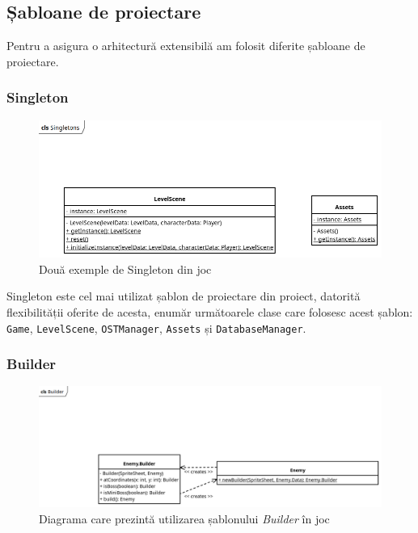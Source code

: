 \documentclass{article}
\begin{document}
    \inputminted[linenos, breaklines]{json}{example-level.json}

    \subsection{Șabloane de proiectare}

    Pentru a asigura o arhitectură extensibilă am folosit diferite șabloane de proiectare.

    \subsubsection{Singleton}
    \begin{figure}[H]
        \includegraphics[width=\textwidth]{singletons-diagram}
        \centering
        \caption{Două exemple de Singleton din joc}
    \end{figure}

    Singleton este cel mai utilizat șablon de proiectare din proiect, datorită flexibilității
    oferite de acesta, enumăr următoarele clase care folosesc acest șablon: \texttt{Game},
    \texttt{LevelScene}, \texttt{OSTManager}, \texttt{Assets} și \texttt{DatabaseManager}.

    \subsubsection{Builder}
    \begin{figure}[H]
        \includegraphics[width=\textwidth]{builder-diagram}
        \centering
        \caption{Diagrama care prezintă utilizarea șablonului \emph{Builder} în joc}
    \end{figure}
\end{document}
